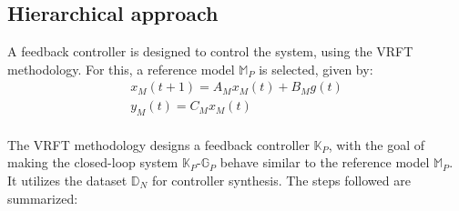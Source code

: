 \documentclass[letterpaper, 10 pt, conference]{ieeeconf}  %
\begin{document}
\subsection{Hierarchical approach}
A feedback controller is designed to control the system, using the VRFT methodology. For this, a reference model $\mathbb{M}_P$ is selected, given by:
	\begin{equation*}
	\begin{matrix}
	x_M(t+1) = A_Mx_M(t) + B_Mg(t)\\
	y_M(t) = C_Mx_M(t)
	\end{matrix}
	\end{equation*}\\  
 The VRFT methodology designs a feedback controller  $\mathbb{K}_P$, with the goal of making the closed-loop system $\mathbb{K}_P$-$\mathbb{G}_P$ behave similar to the reference model $\mathbb{M}_P$. It utilizes the dataset $\mathbb{D}_N$ for controller synthesis. The steps followed are summarized:
\end{document}
